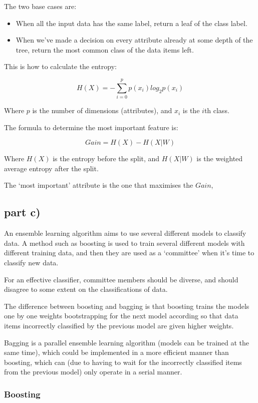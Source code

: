 \documentclass{article}
\begin{document}
The two base cases are:

\begin{itemize}
  \item When all the input data has the same label, return a leaf of the class
    label.
  \item When we've made a decision on every attribute already at some depth of
    the tree, return the most common class of the data items left.
\end{itemize}

This is how to calculate the entropy:

\[
  H(X) = -\sum\limits^p_{i=0}p(x_i)log_2p(x_i)
\]

Where $p$ is the number of dimensions (attributes), and $x_i$ is the $i$th
class.

The formula to determine the most important feature is:

\[
  Gain = H(X) - H(X|W)
\]  

Where $H(X)$ is the entropy before the split, and $H(X|W)$ is the weighted
average entropy after the split.

The `most important' attribute is the one that maximises the $Gain$,

\subsection*{part c)}

An ensemble learning algorithm aims to use several different models to classify
data. A method such as boosting is used to train several different models with
different training data, and then they are used as a `committee' when it's time
to classify new data.

For an effective classifier, committee members should be diverse, and should
disagree to some extent on the classifications of data.

The difference between boosting and bagging is that boosting trains the models
one by one weights bootstrapping for the next model according so that data items
incorrectly classified by the previous model are given higher weights.

Bagging is a parallel ensemble learning algorithm (models can be trained at the
same time), which could be implemented in a more efficient manner than boosting,
which can (due to having to wait for the incorrectly classified items from the
previous model) only operate in a serial manner.

\subsubsection*{Boosting}
\end{document}
